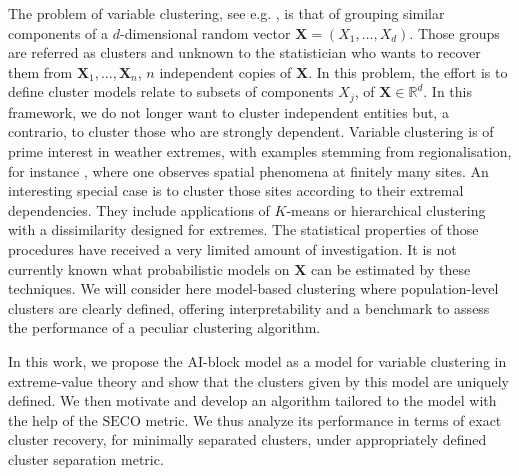 \documentclass[11pt]{article}
\newcommand{\SECO}{\mathrm{SECO}}
\theoremstyle{definition}
\begin{document}
	The problem of variable clustering, see e.g. \cite{bunea2020model, eisenach2020high}, is that of grouping similar components of a $d$-dimensional random vector $\textbf{X} = (X_1,\dots,X_d)$. Those groups are referred as clusters and unknown to the statistician who wants to recover them from $\textbf{X}_1, \dots, \textbf{X}_n$, $n$ independent copies of $\textbf{X}$. In this problem, the effort is to define cluster models relate to subsets of components $X_j$, of $\textbf{X} \in \mathbb{R}^d$. In this framework, we do not longer want to cluster independent entities but, a contrario, to cluster those who are strongly dependent. Variable clustering is of prime interest in weather extremes, with examples stemming from regionalisation, for instance \cite{bador2015spatial,bernard2013clustering, saunders2021regionalisation}, where one observes spatial phenomena at finitely many sites. An interesting special case is to cluster those sites according to their extremal dependencies. They include applications of $K$-means or hierarchical clustering with a dissimilarity designed for extremes. The statistical properties of those procedures have received a very limited amount of investigation. It is not currently known what probabilistic models on $\textbf{X}$ can be estimated by these techniques. We will consider here model-based clustering where population-level clusters are clearly defined, offering interpretability and a benchmark to assess the performance of a peculiar clustering algorithm.
	
	In this work, we propose the AI-block model as a model for variable clustering in extreme-value theory and show that the clusters given by this model are uniquely defined. We then motivate and develop an algorithm tailored to the model with the help of the $\SECO$ metric. We thus analyze its performance in terms of exact cluster recovery, for minimally separated clusters, under appropriately defined cluster separation metric.
\end{document}
